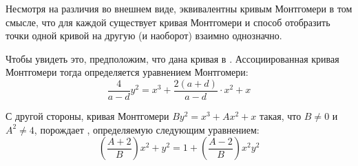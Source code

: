 Несмотря на различия во внешнем виде,  эквивалентны кривым Монтгомери в том смысле, что для каждой  существует кривая Монтгомери и способ отобразить точки одной кривой на другую (и наоборот) взаимно однозначно. 

Чтобы увидеть это, предположим, что дана кривая в . Ассоциированная кривая Монтгомери тогда определяется уравнением Монтгомери:
\begin{equation}
\frac{4}{a-d} y^2 = x^3 + \frac{2(a+d)}{a-d}\cdot x^2 + x 
\end{equation}

С другой стороны, кривая Монтгомери $By^{2}=x^{3}+Ax^{2}+x$ такая, что $B\neq 0$ и $A^2\neq 4$, порождает , определяемую следующим уравнением:
\begin{equation}\label{eq:montgomery-to-twisted-edwards}
(\frac{A+2}{B})x^2+y^2= 1+(\frac{A-2}{B})x^2y^2
\end{equation}

